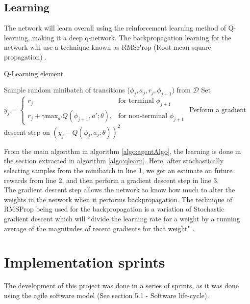 \documentclass[10pt]{article}
\begin{document}
	\medskip
	
	\subsection{Learning}
		The network will learn overall using the reinforcement learning method of Q-learning, making it a deep q-network. The backpropagation learning for the network will use a technique known as RMSProp (Root mean square propagation) \cite{rms}.
		\begin{algorithm}
			\caption{Q-Learning element \cite{humanlevel}}
			\label{algo:qlearn}
			\begin{algorithmic}[1]
				\State Sample random minibatch of transitions ($\phi_j,a_j,r_j,\phi_{j+1}$) from $\mathcal{D}$
				\State Set $y_j =
					\begin{cases}
   						r_j& \text{for terminal } \phi_{j+1}\\
    					r_j + \gamma \text{max}_{a'}Q(\phi_{j+1},a';\theta),& \text{for non-terminal } \phi_{j+1}
					\end{cases}$
				\State Perform a gradient descent step on $(y_j - Q(\phi_j,a_j;\theta))^2$
			\end{algorithmic}
		\end{algorithm}
		
		From the main algorithm in algorithm \ref{algo:agentAlgo}, the learning is done in the section extracted in algorithm \ref{algo:qlearn}. Here, after stochastically selecting samples from the minibatch in line 1, we get an estimate on future rewards from line 2, and then perform a gradient descent step in line 3.\\
		
		The gradient descent step allows the network to know how much to alter the weights in the network when it performs backpropagation. The technique of RMSProp being used for the backpropagation is a variation of Stochastic gradient descent which will ``divide the learning rate for a weight by a running average of the magnitudes of recent gradients for that weight" \cite{rms}.
	
	\bigskip

\section{Implementation sprints}
	The development of this project was done in a series of sprints, as it was done using the agile software model (See section 5.1 - Software life-cycle).
	
\end{document}
